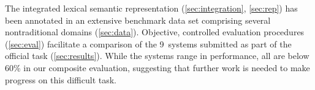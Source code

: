 \documentclass[11pt,letterpaper]{article}
\newcommand{\ensuretext}[1]{#1}
\newcommand{\nssmarker}{\ensuretext{\textcolor{magenta}{\ensuremath{^{\textsc{NS}}_{\textsc{S}}}}}}
\newcommand{\arkcomment}[3]{\ensuretext{\textcolor{#3}{[#1 #2]}}}
\newcommand{\nss}[1]{\arkcomment{\nssmarker}{#1}{magenta}}
\begin{document}

The integrated lexical semantic representation (\cref{sec:integration}, \cref{sec:rep})
has been annotated in an extensive benchmark data set comprising several nontraditional domains (\cref{sec:data}).
Objective, controlled evaluation procedures (\cref{sec:eval})
facilitate a comparison of the 9~systems submitted as part of the official task (\cref{sec:results}).
While the systems range in performance, all are below 60\% in our composite evaluation, 
suggesting that further work is needed to make progress on this difficult task.




\end{document}
